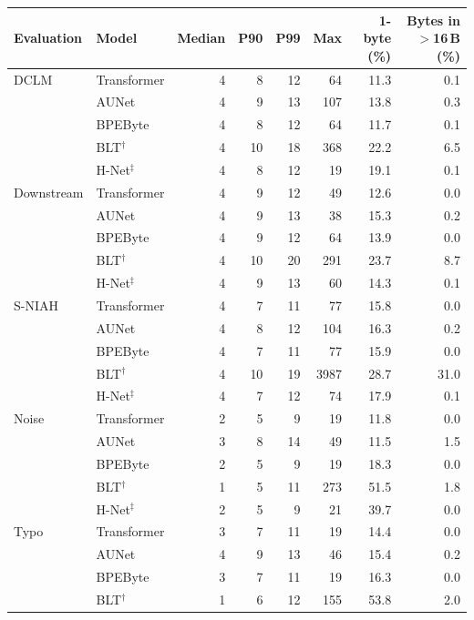 \begin{table}[t]
\centering
\small
\setlength{\tabcolsep}{5pt}
\begin{tabular}{llrrrrrr}
\toprule
\textbf{Evaluation} & \textbf{Model} & \textbf{Median} & \textbf{P90} & \textbf{P99} & \textbf{Max} & \textbf{1-byte (\%)} & \textbf{Bytes in $>$16\,B (\%)} \\
\midrule
DCLM & Transformer & 4 & 8 & 12 & 64 & 11.3 & 0.1 \\
 & AUNet & 4 & 9 & 13 & 107 & 13.8 & 0.3 \\
 & BPEByte & 4 & 8 & 12 & 64 & 11.7 & 0.1 \\
 & BLT$^{\dagger}$ & 4 & 10 & 18 & 368 & 22.2 & 6.5 \\
 & H-Net$^{\ddagger}$ & 4 & 8 & 12 & 19 & 19.1 & 0.1 \\
\midrule
Downstream & Transformer & 4 & 9 & 12 & 49 & 12.6 & 0.0 \\
 & AUNet & 4 & 9 & 13 & 38 & 15.3 & 0.2 \\
 & BPEByte & 4 & 9 & 12 & 64 & 13.9 & 0.0 \\
 & BLT$^{\dagger}$ & 4 & 10 & 20 & 291 & 23.7 & 8.7 \\
 & H-Net$^{\ddagger}$ & 4 & 9 & 13 & 60 & 14.3 & 0.1 \\
\midrule
S-NIAH & Transformer & 4 & 7 & 11 & 77 & 15.8 & 0.0 \\
 & AUNet & 4 & 8 & 12 & 104 & 16.3 & 0.2 \\
 & BPEByte & 4 & 7 & 11 & 77 & 15.9 & 0.0 \\
 & BLT$^{\dagger}$ & 4 & 10 & 19 & 3987 & 28.7 & 31.0 \\
 & H-Net$^{\ddagger}$ & 4 & 7 & 12 & 74 & 17.9 & 0.1 \\
\midrule
Noise & Transformer & 2 & 5 & 9 & 19 & 11.8 & 0.0 \\
 & AUNet & 3 & 8 & 14 & 49 & 11.5 & 1.5 \\
 & BPEByte & 2 & 5 & 9 & 19 & 18.3 & 0.0 \\
 & BLT$^{\dagger}$ & 1 & 5 & 11 & 273 & 51.5 & 1.8 \\
 & H-Net$^{\ddagger}$ & 2 & 5 & 9 & 21 & 39.7 & 0.0 \\
\midrule
Typo & Transformer & 3 & 7 & 11 & 19 & 14.4 & 0.0 \\
 & AUNet & 4 & 9 & 13 & 46 & 15.4 & 0.2 \\
 & BPEByte & 3 & 7 & 11 & 19 & 16.3 & 0.0 \\
 & BLT$^{\dagger}$ & 1 & 6 & 12 & 155 & 53.8 & 2.0 \\

\end{tabular}
\end{table}

